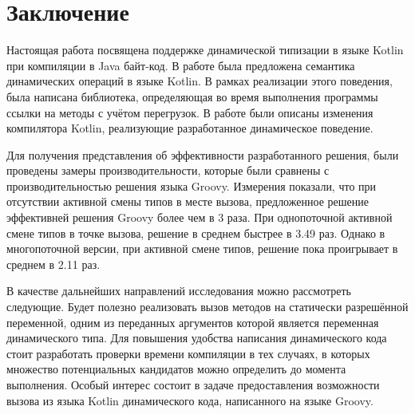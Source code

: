 \vfill
\clearpage
\section*{Заключение}


Настоящая работа посвящена поддержке динамической типизации в языке Kotlin при компиляции в Java байт-код.
В работе была предложена семантика динамических операций в языке Kotlin. В рамках реализации этого поведения, была написана библиотека, определяющая во время выполнения программы ссылки на методы с учётом перегрузок. В работе были описаны изменения компилятора Kotlin, реализующие разработанное динамическое поведение. 

Для получения представления об эффективности разработанного решения, были проведены замеры производительности, которые были сравнены с производительностью решения языка Groovy.
Измерения показали, что при отсутствии активной смены типов в месте вызова, предложенное решение эффективней решения Groovy более чем в 3 раза. При однопоточной активной смене типов в точке вызова, решение в среднем быстрее в 3.49 раз. Однако в многопоточной версии, при активной смене типов, решение пока проигрывает в среднем в 2.11 раз.


В качестве дальнейших направлений исследования можно рассмотреть следующие. Будет полезно реализовать вызов методов на статически разрешённой переменной, одним из переданных аргументов которой является переменная динамического типа. Для повышения удобства написания динамического кода стоит разработать проверки времени компиляции в тех случаях, в которых множество потенциальных кандидатов можно определить до момента выполнения. Особый интерес состоит в задаче предоставления возможности вызова из языка Kotlin динамического кода, написанного на языке Groovy.

